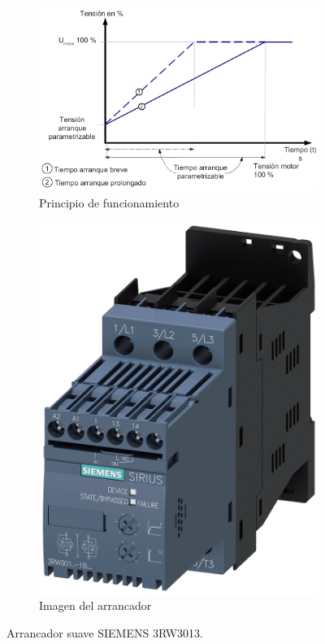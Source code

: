 \begin{figure}
	\centering
	\begin{subfigure}[b]{0.69\textwidth}
		\centering
		\includegraphics[width=\textwidth]{fig/RampasArrancador}
		\caption{Principio de funcionamiento}
		\label{fig:rampasarrancador}
	\end{subfigure}
	\hfill
	\begin{subfigure}[b]{0.3\textwidth}
		\centering
		\includegraphics[width=\textwidth]{fig/3RW3013-1BB14_G_IC03_XX_31074P}
		\caption{Imagen del arrancador}
		\label{fig:3rw3013-1bb14gic03xx31074p}
		
	\end{subfigure}
	\caption{Arrancador suave SIEMENS 3RW3013.\cite{SIEMENS}}
\end{figure}


